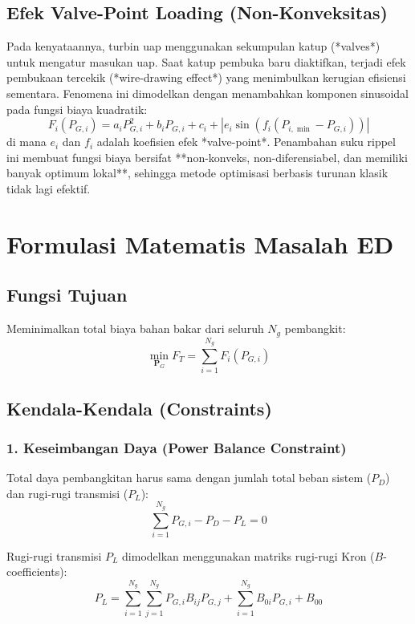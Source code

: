 \documentclass[11pt,a4paper]{article}
\begin{document}
\subsection{Efek Valve-Point Loading (Non-Konveksitas)}
Pada kenyataannya, turbin uap menggunakan sekumpulan katup (*valves*) untuk mengatur masukan uap. Saat katup pembuka baru diaktifkan, terjadi efek pembukaan tercekik (*wire-drawing effect*) yang menimbulkan kerugian efisiensi sementara. Fenomena ini dimodelkan dengan menambahkan komponen sinusoidal pada fungsi biaya kuadratik:
\begin{equation}
    F_i(P_{G,i}) = a_i P_{G,i}^2 + b_i P_{G,i} + c_i + |e_i \sin(f_i(P_{i,\min} - P_{G,i}))|
\end{equation}
di mana $e_i$ dan $f_i$ adalah koefisien efek *valve-point*. Penambahan suku rippel ini membuat fungsi biaya bersifat **non-konveks, non-diferensiabel, dan memiliki banyak optimum lokal**, sehingga metode optimisasi berbasis turunan klasik tidak lagi efektif.

\section{Formulasi Matematis Masalah ED}

\subsection{Fungsi Tujuan}
Meminimalkan total biaya bahan bakar dari seluruh $N_g$ pembangkit:
\begin{equation}
    \min_{\mathbf{P}_G} F_T = \sum_{i=1}^{N_g} F_i(P_{G,i})
\end{equation}

\subsection{Kendala-Kendala (Constraints)}

\subsubsection{1. Keseimbangan Daya (Power Balance Constraint)}
Total daya pembangkitan harus sama dengan jumlah total beban sistem ($P_D$) dan rugi-rugi transmisi ($P_L$):
\begin{equation}
    \sum_{i=1}^{N_g} P_{G,i} - P_D - P_L = 0
\end{equation}

Rugi-rugi transmisi $P_L$ dimodelkan menggunakan matriks rugi-rugi Kron ($B$-coefficients):
\begin{equation}
    P_L = \sum_{i=1}^{N_g} \sum_{j=1}^{N_g} P_{G,i} B_{ij} P_{G,j} + \sum_{i=1}^{N_g} B_{0i} P_{G,i} + B_{00}
\end{equation}
\end{document}
